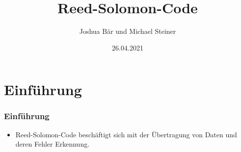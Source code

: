 \documentclass[11pt,aspectratio=169]{beamer}
\begin{document}
	\author{Joshua Bär und Michael Steiner}
	\title{Reed-Solomon-Code}
	\subtitle{}
	\logo{}
	\date{26.04.2021}
	\subject{Mathematisches Seminar}
	\begin{frame}[plain]
		\maketitle
	\end{frame}
	\section{Einführung}
	\begin{frame}
		\frametitle{Einführung}
		\begin{itemize}
		\item Reed-Solomon-Code beschäftigt sich mit der Übertragung von Daten
		und deren Fehler Erkennung.
		\end{itemize}
	\end{frame}
\end{document}
